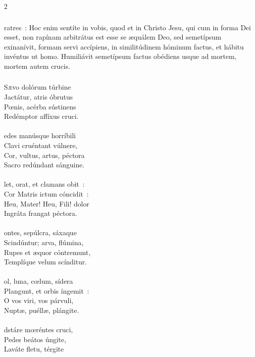 \documentclass[9pt,twoside]{extarticle}
\begin{document}
\begin{multicols}{2}
{{{\subsubsection*{}
ratres~: Hoc enim sentíte in vobis, quod et in Christo Jesu, qui cum in forma Dei esset, non rapínam arbitrátus est esse se æquálem Deo, sed semetípsum exinanívit, formam servi accípiens, in similitúdinem hóminum factus, et hábitu invéntus ut homo. Humiliávit semetípsum factus obédiens usque ad mortem, mortem autem crucis.

\subsubsection*{\center {}}
\lettrine{S}ævo dolórum túrbine\\
Jactátur, atris óbrutus\\
Pœnis, acérba sústinens\\
Redémptor affíxus cruci.\\
\\
edes manúsque horríbili\\
Clavi cruéntant vúlnere,\\
Cor, vultus, artus, péctora\\
Sacro redúndant sánguine.\\
\\
let, orat, et clamans obit~:\\
Cor Matris ictum cóncidit~:\\
Heu, Mater! Heu, Fili! dolor\\
Ingráta frangat péctora.\\
\\
ontes, sepúlcra, sáxaque\\
Scindúntur; arva, flúmina,\\
Rupes et æquor cóntremunt,\\
Templíque velum scínditur.\\
\\
ol, luna, cœlum, sídera\\
Plangunt, et orbis íngemit~:\\
O vos viri, vos párvuli,\\
Nuptæ, puéllæ, plángite.\\
\\
dstáre mœréntes cruci,\\
Pedes beátos úngite,\\
Laváte fletu, térgite\\
}}}
\end{multicols}
\end{document}
